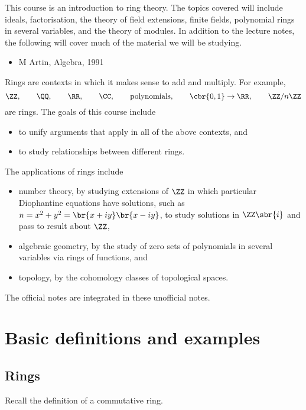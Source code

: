 This course is an introduction to ring theory. The topics covered will include ideals, factorisation, the theory of field extensions, finite fields, polynomial rings in several variables, and the theory of modules. In addition to the lecture notes, the following will cover much of the material we will be studying.
\begin{itemize}
\item M Artin, Algebra, 1991
\end{itemize}
Rings are contexts in which it makes sense to add and multiply. For example,
$$ \ZZ, \qquad \QQ, \qquad \RR, \qquad \CC, \qquad \text{polynomials}, \qquad \cbr{0, 1} \to \RR, \qquad \ZZ / n\ZZ $$
are rings. The goals of this course include
\begin{itemize}
\item to unify arguments that apply in all of the above contexts, and
\item to study relationships between different rings.
\end{itemize}
The applications of rings include
\begin{itemize}
\item number theory, by studying extensions of $ \ZZ $ in which particular Diophantine equations have solutions, such as $ n = x^2 + y^2 = \br{x + iy}\br{x - iy} $, to study solutions in $ \ZZ\sbr{i} $ and pass to result about $ \ZZ $,
\item algebraic geometry, by the study of zero sets of polynomials in several variables via rings of functions, and
\item topology, by the cohomology classes of topological spaces.
\end{itemize}

\begin{note*}
The official notes are integrated in these unofficial notes.
\end{note*}

\pagebreak

\section{Basic definitions and examples}

\subsection{Rings}

Recall the definition of a commutative ring.

